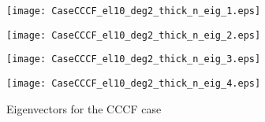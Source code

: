 \documentclass[preprint,12pt]{elsarticle}
\begin{document}
\begin{figure}[p]%
	\texttt{[image: CaseCCCF\_el10\_deg2\_thick\_n\_eig\_1.eps]}
	\caption*{$\widehat{\omega}_{\frac{1}{2}1}$}\label{fig:CCCF1}%
	\endminipage
	\texttt{[image: CaseCCCF\_el10\_deg2\_thick\_n\_eig\_2.eps]}
	\caption*{$\widehat{\omega}_{\frac{3}{2}1}$}\label{fig:CCCF2}%
	\endminipage
	\texttt{[image: CaseCCCF\_el10\_deg2\_thick\_n\_eig\_3.eps]}
	\caption*{$\widehat{\omega}_{\frac{1}{2}2}$}\label{fig:CCCF3}%
	\endminipage 
	\texttt{[image: CaseCCCF\_el10\_deg2\_thick\_n\_eig\_4.eps]}
	\caption*{$\widehat{\omega}_{\frac{5}{2}1}$}\label{fig:CCCF4}%
	\endminipage
	\caption[Eigenvectors for CCCC]{Eigenvectors for the CCCF case}%
	\label{fig:CCCF}%
\end{figure}
\end{document}
